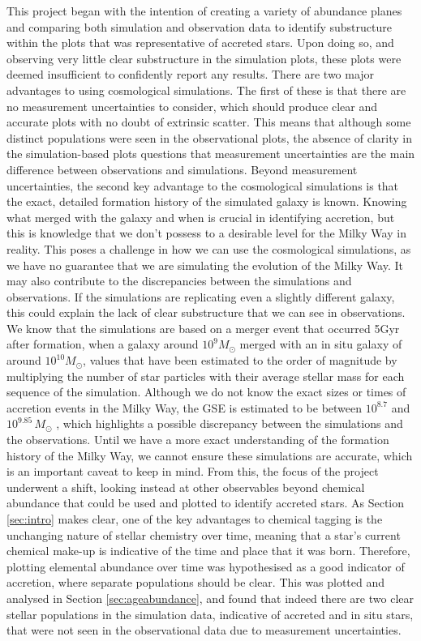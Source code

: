 \documentclass[fleqn,usenatbib]{mnras}
\begin{document}
This project began with the intention of creating a variety of abundance planes and comparing both simulation and observation data to identify substructure within the plots that was representative of accreted stars. Upon doing so, and observing very little clear substructure in the simulation plots, these plots were deemed insufficient to confidently report any results. There are two major advantages to using cosmological simulations. The first of these is that there are no measurement uncertainties to consider, which should produce clear and accurate plots with no doubt of extrinsic scatter. This means that although some distinct populations were seen in the observational plots, the absence of clarity in the simulation-based plots questions that measurement uncertainties are the main difference between observations and simulations.   
Beyond measurement uncertainties, the second key advantage to the cosmological simulations is that the exact, detailed formation history of the simulated galaxy is known. Knowing what merged with the galaxy and when is crucial in identifying accretion, but this is knowledge that we don't possess to a desirable level for the Milky Way in reality. This poses a challenge in how we can use the cosmological simulations, as we have no guarantee that we are simulating the evolution of the Milky Way. It may also contribute to the discrepancies between the simulations and observations. If the simulations are replicating even a slightly different galaxy, this could explain the lack of clear substructure that we can see in observations. We know that the simulations are based on a merger event that occurred 5Gyr after formation, when a galaxy around $10^9 M_{\odot}$ merged with an in situ galaxy of around $10^{10} M_{\odot}$, values that have been estimated to the order of magnitude by multiplying the number of star particles with their average stellar mass for each sequence of the simulation. Although we do not know the exact sizes or times of accretion events in the Milky Way, the GSE is estimated to be between $10^{8.7}$ and $10^{9.85}\,M_{\odot}$ \citep{Helmi2018,Naidu2020}, which highlights a possible discrepancy between the simulations and the observations. Until we have a more exact understanding of the formation history of the Milky Way, we cannot ensure these simulations are accurate, which is an important caveat to keep in mind.   
From this, the focus of the project underwent a shift, looking instead at other observables beyond chemical abundance that could be used and plotted to identify accreted stars. As Section \ref{sec:intro} makes clear, one of the key advantages to chemical tagging is the unchanging nature of stellar chemistry over time, meaning that a star's current chemical make-up is indicative of the time and place that it was born. Therefore, plotting elemental abundance over time was hypothesised as a good indicator of accretion, where separate populations should be clear. This was plotted and analysed in Section \ref{sec:ageabundance}, and found that indeed there are two clear stellar populations in the simulation data, indicative of accreted and in situ stars, that were not seen in the observational data due to measurement uncertainties.  
\end{document}

